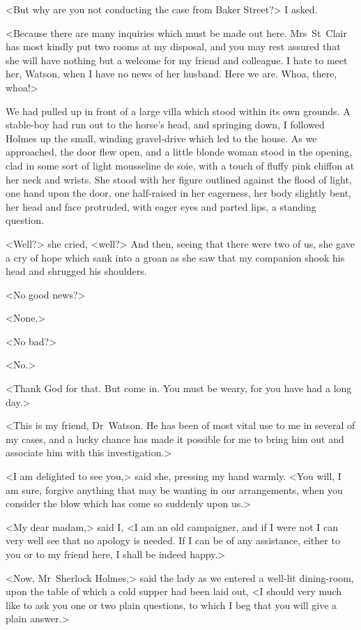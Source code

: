 <But why are you not conducting the case from Baker Street?> I asked.

<Because there are many inquiries which must be made out here. Mrs~St~Clair has most kindly put two rooms at my disposal, and you may rest assured that she will have nothing but a welcome for my friend and colleague. I hate to meet her, Watson, when I have no news of her husband. Here we are. Whoa, there, whoa!>

We had pulled up in front of a large villa which stood within its own grounds. A stable-boy had run out to the horse's head, and springing down, I followed Holmes up the small, winding gravel-drive which led to the house. As we approached, the door flew open, and a little blonde woman stood in the opening, clad in some sort of light mousseline de soie, with a touch of fluffy pink chiffon at her neck and wrists. She stood with her figure outlined against the flood of light, one hand upon the door, one half-raised in her eagerness, her body slightly bent, her head and face protruded, with eager eyes and parted lips, a standing question.

<Well?> she cried, <well?> And then, seeing that there were two of us, she gave a cry of hope which sank into a groan as she saw that my companion shook his head and shrugged his shoulders.

<No good news?>

<None.>

<No bad?>

<No.>

<Thank God for that. But come in. You must be weary, for you have had a long day.>

<This is my friend, Dr~Watson. He has been of most vital use to me in several of my cases, and a lucky chance has made it possible for me to bring him out and associate him with this investigation.>

<I am delighted to see you,> said she, pressing my hand warmly. <You will, I am sure, forgive anything that may be wanting in our arrangements, when you consider the blow which has come so suddenly upon us.>

<My dear madam,> said I, <I am an old campaigner, and if I were not I can very well see that no apology is needed. If I can be of any assistance, either to you or to my friend here, I shall be indeed happy.>

<Now, Mr~Sherlock Holmes,> said the lady as we entered a well-lit dining-room, upon the table of which a cold supper had been laid out, <I should very much like to ask you one or two plain questions, to which I beg that you will give a plain answer.>

